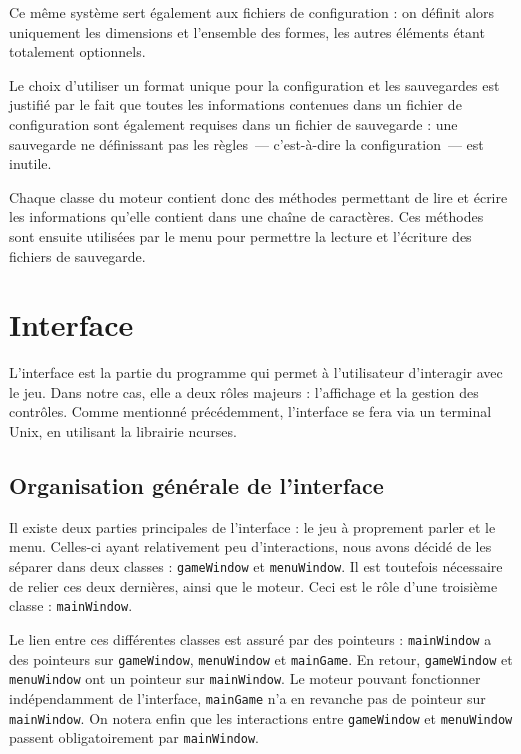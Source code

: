 \documentclass[11pt,a4paper]{article}
\begin{document}
Ce même système sert également aux fichiers de configuration : on définit alors uniquement les dimensions et l'ensemble des formes, les autres éléments étant totalement optionnels.

Le choix d'utiliser un format unique pour la configuration et les sauvegardes est justifié par le fait que toutes les informations contenues dans un fichier de configuration sont également requises dans un fichier de sauvegarde : une sauvegarde ne définissant pas les règles~--- c'est-à-dire la configuration~--- est inutile.

Chaque classe du moteur contient donc des méthodes permettant de lire et écrire les informations qu'elle contient dans une chaîne de caractères. Ces méthodes sont ensuite utilisées par le menu pour permettre la lecture et l'écriture des fichiers de sauvegarde.


\section{Interface}
L'interface est la partie du programme qui permet à l'utilisateur d'interagir avec le jeu. Dans notre cas, elle a deux rôles majeurs : l'affichage et la gestion des contrôles. Comme mentionné précédemment, l'interface se fera via un terminal Unix, en utilisant la librairie ncurses.

\subsection{Organisation générale de l'interface}
Il existe deux parties principales de l'interface : le jeu à proprement parler et le menu. Celles-ci ayant relativement peu d'interactions, nous avons décidé de les séparer dans deux classes : \verb"gameWindow" et \verb"menuWindow". Il est toutefois nécessaire de relier ces deux dernières, ainsi que le moteur. Ceci est le rôle d'une troisième classe : \verb"mainWindow".

Le lien entre ces différentes classes est assuré par des pointeurs : \verb"mainWindow" a des pointeurs sur \verb"gameWindow", \verb"menuWindow" et \verb"mainGame". En retour, \verb"gameWindow" et \verb"menuWindow" ont un pointeur sur \verb"mainWindow". Le moteur pouvant fonctionner indépendamment de l'interface, \verb"mainGame" n'a en revanche pas de pointeur sur \verb"mainWindow". On notera enfin que les interactions entre \verb"gameWindow" et \verb"menuWindow" passent obligatoirement par \verb"mainWindow".
\end{document}
